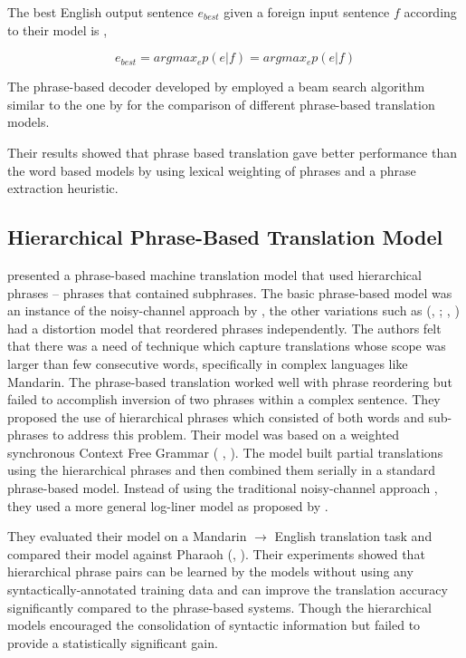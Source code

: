 The best English output sentence $e_{best}$ given a foreign input sentence $f$ according to their model is ,

$$
 e_{best}= argmax_ep(e|f)
         = argmax_ep(e|f)
$$

The phrase-based decoder developed by \cite{Koehn:2003:SPT:1073445.1073462} employed a beam search algorithm similar to the one by \citep{Jelinek76continuousspeech}  for the comparison of different phrase-based translation models.

Their results showed that phrase based translation gave better performance than the word based models by using lexical weighting of phrases and a phrase extraction heuristic.

\subsection{Hierarchical Phrase-Based Translation Model}

\cite{Chiang:2005:HPM:1219840.1219873} presented a  phrase-based machine translation model that used hierarchical phrases – phrases that contained subphrases. The basic phrase-based model was an instance of the noisy-channel approach by \cite{Brown:1993:MSM:972470.972474}, the other variations such as (\citeauthor{W99-0604}, \citeyear{W99-0604}; \citeauthor{Koehn:2003:SPT:1073445.1073462}, \citeyear{Koehn:2003:SPT:1073445.1073462}) had a distortion model that reordered phrases independently. The authors felt that there was a need of technique which capture translations whose scope was larger than few consecutive words, specifically in complex languages like Mandarin. The phrase-based translation worked well with phrase reordering but failed to accomplish inversion of two phrases within a complex sentence. They proposed the use of hierarchical phrases which consisted of both words and sub-phrases to address this problem. Their model was based on a weighted synchronous Context Free Grammar ( \citeauthor{Aho:1969:SDT:1739930.1740037}, \citeyear{Aho:1969:SDT:1739930.1740037}). The model built partial translations using the hierarchical phrases and then combined them serially in a standard phrase-based model.  Instead of using the traditional noisy-channel approach , they used a more general log-liner model as proposed by \cite{Och:2002:DTM:1073083.1073133}.

They evaluated their model on a Mandarin $\rightarrow$ English translation task and compared their model against Pharaoh (\citeauthor{10.1007/978-3-540-30194-3_13}, \citeyear{10.1007/978-3-540-30194-3_13}). Their experiments showed that hierarchical phrase pairs can be learned by the models without using any syntactically-annotated training data and can improve the translation accuracy significantly compared to the phrase-based systems. Though the hierarchical models encouraged the consolidation of syntactic information but failed to provide a statistically significant gain.

